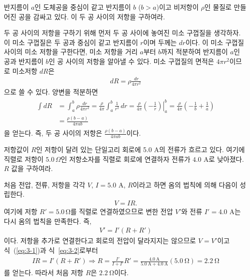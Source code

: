 \documentclass[tightenlines,floatfix,nofootinbib,superscriptaddress,fleqn]{revtex4-2}
\begin{document}
 반지름이 $a$인 도체공을 중심이 같고
반지름이 $b$ ($b>a$)이고 비저항이 $\rho$인 물질로 만들어진 공을 감싸고
있다. 이 두 공 사이의 저항을 구하여라.  

\vspace{0.5cm}

두 공 사이의 저항을 구하기 위해 먼저 두 공 사이에 놓여진 미소 구껍질을 생각하자. 이 미소 구껍질은
두 공과 중심이 같고 반지름이 $r$이며 두께는 $dr$이다. 이 미소 구껍질 사이의 미소 저항을 구한다면,
미소 저항을 거리 $a$부터 $b$까지 적분하여 반지름이 $a$인 공과 반지름이 $b$인 공 사이의 저항을
알아낼 수 있다. 미소 구껍질의 면적은 $4\pi r^2$이므로 미소저항 $dR$은
\begin{align}
  dR = \rho\frac{dr}{4\pi r^2}
\end{align}
으로 쓸 수 있다. 양변을 적분하면
\begin{align}
  \begin{split}
    \int dR &= \int^b_a  \rho\frac{dr}{4\pi r^2}
    =\frac{\rho}{4\pi}\int^b_a\frac{1}{r^2}\,dr
    =\frac{\rho}{4\pi}\left.\left(-\frac{1}{r}\right)\right|^{b}_{a}
    =\frac{\rho}{4\pi}\left(
      -\frac{1}{b}+\frac{1}{a}
      \right) \\
    &= \frac{\rho(b-a)}{4\pi ab}
    \end{split}
\end{align}
을 얻는다. 즉, 두 공 사이의 저항은 $\frac{\rho(b-a)}{4\pi ab}$이다.
\vspace{0.5cm}

저항값이 $R$인 저항이 달려 있는 단일고리
회로에 5.0 A의 전류가 흐르고 있다. 여기에 직렬로 저항이 $5.0\,\Omega$인
저항소자를 직렬로 회로에 연결하자 전류가 $4.0$ A로 낮아졌다. $R$ 값을
구하여라.   

\vspace{0.5cm}

처음 전압, 전류, 저항을 각각 $V$, $I=5.0$ A, $R$이라고 하면 옴의 법칙에 의해 다음이 성립한다.
\begin{align}\label{eq:3-1}
  V = IR.
\end{align}
여기에 저항 $R'=5.0\,\mathrm{\Omega}$를 직렬로 연결하였으므로 변한 전압 $V'$와 전류 $I'=4.0$
A는 다시 옴의 법칙을 만족한다. 즉,
\begin{align}\label{eq:3-2}
  V' = I'(R+R')
\end{align} 
이다. 저항을 추가로 연결한다고 회로의 전압이 달라지지는 않으므로 $V=V'$이고 식~(\ref{eq:3-1})과
식~\eqref{eq:3-2}로부터
\begin{align}
  IR=I'(R+R')\Longrightarrow
  R = \frac{I'}{I+I'}R'=\frac{4.0~\mathrm{A}}{5.0~\mathrm{A}+4.0~\mathrm{A}}
  (5.0~\mathrm{\Omega})=2.2~\mathrm{\Omega}
\end{align}
를 얻는다. 따라서 처음 저항 $R$은 $2.2~\mathrm{\Omega}$이다.
\vspace{0.5cm}
\end{document}

